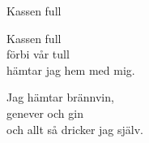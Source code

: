\begin{song}{Kassen full}
	
	
	
	Kassen full\\
	förbi vår tull\\
	hämtar jag hem med mig.\\
	\begin{repetition}
		Jag hämtar brännvin,\\
		genever och gin\\
		och allt så dricker jag själv.
	\end{repetition}
	
\end{song}
